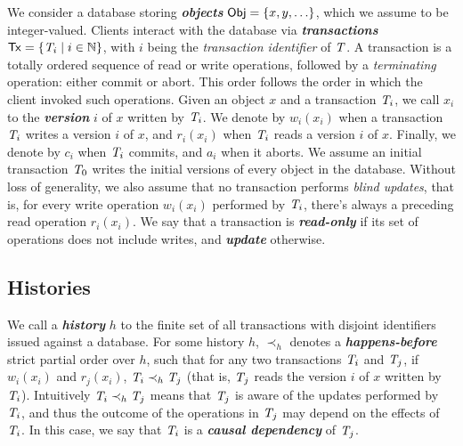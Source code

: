 We consider a database storing \textbf{\em objects} ${\sf Obj} = \{x, y, \ldots\}$, which we assume to be integer-valued. Clients interact with the database via \textbf{\em transactions} ${\sf Tx} = \{\mathit{T}_i \mid i \in \mathbb{N}\}$, with $i$ being the \emph{transaction identifier} of $\mathit{T}$. A transaction is a totally ordered sequence of read or write operations, followed by a \emph{terminating} operation: either commit or abort. This order follows the order in which the client invoked such operations. Given an object $x$ and a transaction $\mathit{T}_i$, we call $x_i$ to the \textbf{\em version} $i$ of $x$ written by $\mathit{T}_i$. We denote by $w_i(x_i)$ when a transaction $\mathit{T}_i$ writes a version $i$ of $x$, and $r_i(x_i)$ when $\mathit{T}_i$ reads a version $i$ of $x$. Finally, we denote by $c_i$ when $\mathit{T}_i$ commits, and $a_i$ when it aborts. We assume an initial transaction $\mathit{T}_0$ writes the initial versions of every object in the database. Without loss of generality, we also assume that no transaction performs \emph{blind updates}, that is, for every write operation $w_i(x_i)$ performed by $\mathit{T}_i$, there's always a preceding read operation $r_i(x_i)$. We say that a transaction is \textbf{\em read-only} if its set of operations does not include writes, and \textbf{\em update} otherwise.

\subsection{Histories}

We call a \textbf{\em history} $h$ to the finite set of all transactions with disjoint identifiers issued against a database. For some history $h$, $\prec_h$ denotes a \textbf{\em happens-before} strict partial order over $h$, such that for any two transactions $\mathit{T}_i$ and $\mathit{T}_j$, if $w_i(x_i)$ and $r_j(x_i)$, $\mathit{T}_i \prec_h \mathit{T}_j$ (that is, $\mathit{T}_j$ reads the version $i$ of $x$ written by $\mathit{T}_i$). Intuitively $\mathit{T}_i \prec_h \mathit{T}_j$ means that $\mathit{T}_j$ is aware of the updates performed by $\mathit{T}_i$, and thus the outcome of the operations in $\mathit{T}_j$ may depend on the effects of $\mathit{T}_i$. In this case, we say that $\mathit{T}_i$ is a \textbf{\em causal dependency} of $\mathit{T}_j$.



